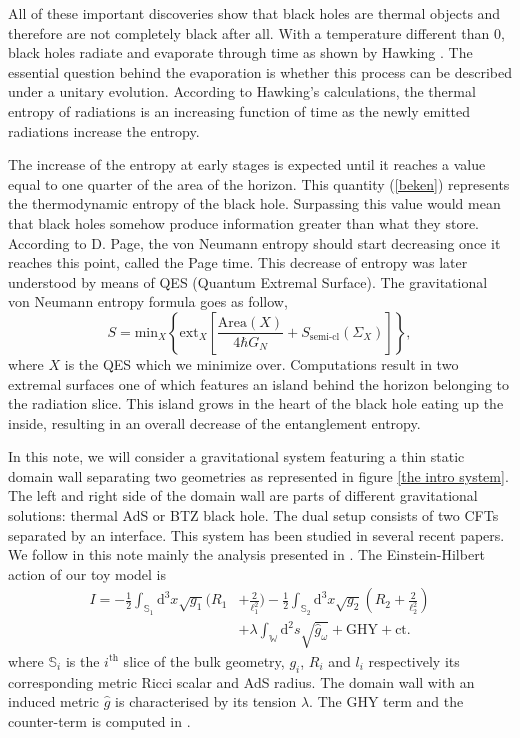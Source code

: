 All of these important discoveries show that black holes are thermal objects and therefore are not completely black after all. With a temperature different than 0, black holes radiate and evaporate through time as shown by Hawking \cite{Hawking1975}. The essential question behind the evaporation is whether this process can be described under a unitary evolution. According to Hawking's calculations, the thermal entropy of radiations is an increasing function of time as the newly emitted radiations increase the entropy.

The increase of the entropy at early stages is expected until it reaches a value equal to one quarter of the area of the horizon. This quantity (\ref{beken}) represents the thermodynamic entropy of the black hole. Surpassing this value would mean that black holes somehow produce information greater than what they store. According to D. Page\cite{PhysRevLett.71.3743}, the von Neumann entropy should start decreasing once it reaches this point, called the Page time. This decrease of entropy was later understood by means of QES (Quantum Extremal Surface). The gravitational von Neumann entropy formula goes as follow\cite{almheiri2020entropy},
\begin{equation}
    S = \text{min}_X\left\{\text{ext}_X\left[\frac{\text{Area}\left(X\right)}{4\hbar G_N} + S_\text{semi-cl}\left(\Sigma_X\right)\right]\right\},
\end{equation}
where $X$ is the QES which we minimize over. Computations result in two extremal surfaces one of which features an island behind the horizon belonging to the radiation slice. This island grows in the heart of the black hole eating up the inside, resulting in an overall decrease of the entanglement entropy.

In this note, we will consider a gravitational system featuring a thin static domain wall separating two geometries as represented in figure \ref{the intro system}. The left and right side of the domain wall are parts of different gravitational solutions: thermal AdS or BTZ black hole. The dual setup consists of two CFTs separated by an interface. This system has been studied in several recent papers\cite{Simidzija_2020, Bachas_2002, DeWolfe_2002}. We follow in this note mainly the analysis presented in \cite{Bachas_2021}. The Einstein-Hilbert action of our toy model is
\begin{equation}\label{action cft}
    \begin{split}
        I = -\frac{1}{2}\int_{\mathbb{S}_1}\text{d}^3x\sqrt{g_1}(R_1&+\frac{2}{\ell_1^2}) -\frac{1}{2}\int_{\mathbb{S}_2}\text{d}^3x\sqrt{g_2}(R_2+\frac{2}{\ell_2^2})\\
        & +\lambda  \int_{\mathbb{W}} \text{d}^2s\sqrt{\hat{g}_\omega} + \text{GHY} + \text{ct.}
    \end{split}
\end{equation}
where $\mathbb{S}_i$ is the $i^\text{th}$ slice of the bulk geometry, $g_i$, $R_i$ and $l_i$ respectively its corresponding metric Ricci scalar and AdS radius. The domain wall with an induced metric $\hat{g}$ is characterised by its tension $\lambda$. The GHY term and the counter-term is computed in \cite{Bachas_2021}.

